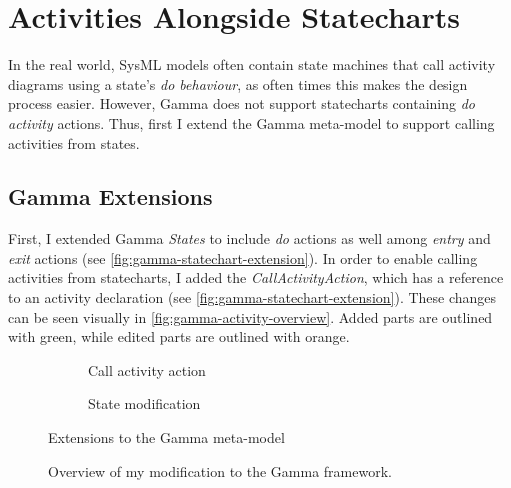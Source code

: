 \section{Activities Alongside Statecharts}\label{sec:activities-alongside-statecharts}

In the real world, SysML models often contain state machines that call activity diagrams using a state's \emph{do behaviour}, as often times this makes the design process easier. However, Gamma does not support statecharts containing \emph{do activity} actions. Thus, first I extend the Gamma meta-model to support calling activities from states.

\subsection{Gamma Extensions}

First, I extended Gamma \emph{States} to include \emph{do} actions as well among \emph{entry} and \emph{exit} actions (see \autoref{fig:gamma-statechart-extension}). In order to enable calling activities from statecharts, I added the \emph{CallActivityAction}, which has a reference to an activity declaration (see \autoref{fig:gamma-statechart-extension}). These changes can be seen visually in \autoref{fig:gamma-activity-overview}. Added parts are outlined with green, while edited parts are outlined with orange.

\begin{figure}[!ht]
	\begin{subfigure}{.5\textwidth}
		\centering
		
		\caption{Call activity action}
		\label{fig:gamma-activity-extension}
	\end{subfigure}%
	\begin{subfigure}{.5\textwidth}
		\centering
		
		\caption{State modification}
		\label{fig:gamma-statechart-extension}
	\end{subfigure}
	\caption{Extensions to the Gamma meta-model}
	\label{fig:gamma-extension}
\end{figure}

\begin{figure}[!ht]
	\centering
	
	\caption{Overview of my modification to the Gamma framework.}
	\label{fig:gamma-activity-overview}
\end{figure}

